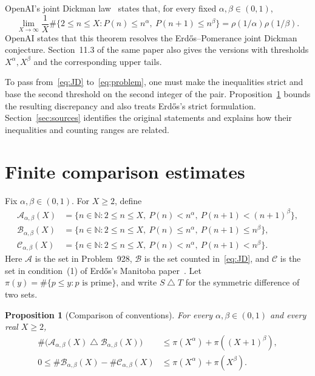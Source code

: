 \documentclass[11pt,a4paper]{amsart}
\newtheorem{proposition}{Proposition}
\newcommand{\N}{\mathbb N}
\newcommand{\A}{\mathcal A}
\newcommand{\B}{\mathcal B}
\newcommand{\C}{\mathcal C}
\begin{document}
OpenAI's joint Dickman law~\cite[Theorem~1.1, p.~2]{OpenAI2026}
states that, for every fixed
$\alpha,\beta\in(0,1)$,
\begin{equation}\label{eq:JD}
 \lim_{X\to\infty}\frac1X
 \#\{2\le n\le X:P(n)\le n^\alpha,\ P(n+1)\le n^\beta\}
 =\rho(1/\alpha)\rho(1/\beta).
\end{equation}
OpenAI states that this theorem resolves the Erd\H{o}s--Pomerance
joint Dickman conjecture. Section~11.3 of the same paper also gives
the versions with thresholds $X^\alpha,X^\beta$ and the corresponding
upper tails.

To pass from~\eqref{eq:JD} to~\eqref{eq:problem}, one must make the
inequalities strict and base the second threshold on the second
integer of the pair. Proposition~\ref{prop:comparison} bounds the
resulting discrepancy and also treats Erd\H{o}s's strict formulation.
Section~\ref{sec:sources} identifies the original statements and
explains how their inequalities and counting ranges are related.

\section{Finite comparison estimates}\label{sec:comparison}

Fix $\alpha,\beta\in(0,1)$. For $X\ge2$, define
\begin{align*}
 \A_{\alpha,\beta}(X)
   &=\{n\in\N:2\le n\le X,\ P(n)<n^\alpha,
                                \ P(n+1)<(n+1)^\beta\},\\
 \B_{\alpha,\beta}(X)
   &=\{n\in\N:2\le n\le X,\ P(n)\le n^\alpha,
                                \ P(n+1)\le n^\beta\},\\
 \C_{\alpha,\beta}(X)
   &=\{n\in\N:2\le n\le X,\ P(n)<n^\alpha,
                                \ P(n+1)<n^\beta\}.
\end{align*}
Here $\A$ is the set in Problem~928, $\B$ is the set counted
in~\eqref{eq:JD}, and $\C$ is the set in condition~(1) of
Erd\H{o}s's Manitoba paper~\cite[p.~25]{Erdos1976Manitoba}.
Let
$\pi(y)=\#\{p\le y:p\text{ is prime}\}$, and write
$S\mathbin\triangle T$ for the symmetric difference of two sets.

\begin{proposition}[Comparison of conventions]\label{prop:comparison}
For every $\alpha,\beta\in(0,1)$ and every real $X\ge2$,
\begin{align}
 \#\bigl(\A_{\alpha,\beta}(X)\mathbin\triangle
          \B_{\alpha,\beta}(X)\bigr)
 &\le \pi(X^\alpha)+\pi((X+1)^\beta),\label{eq:AB}\\
 0\le\#\B_{\alpha,\beta}(X)-\#\C_{\alpha,\beta}(X)
 &\le \pi(X^\alpha)+\pi(X^\beta).\label{eq:BC}
\end{align}
\end{proposition}
\end{document}
